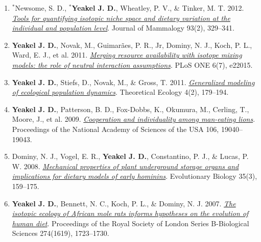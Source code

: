 \documentclass[margin,line,12pt]{res}
\begin{document}
\begin{resume}
\begin{enumerate}
\item ${}^\ast$Newsome, S. D., \textbf{${}^\ast$Yeakel J. D.}, Wheatley, P. V., \& Tinker, M. T. 2012. \href{https://academic.oup.com/jmammal/article/93/2/329/919625}{\emph{Tools for quantifying isotopic niche space and dietary variation at the individual and population level}}. Journal of Mammalogy 93(2), 329–341.

\item \textbf{Yeakel J. D.}, Novak, M., Guimar\~aes, P. R., Jr, Dominy, N. J., Koch, P. L., Ward, E. J., et al. 2011. \href{https://journals.plos.org/plosone/article?id=10.1371/journal.pone.0022015}{\emph{Merging resource availability with isotope mixing models: the role of neutral interaction assumptions}}. PLoS ONE 6(7), e22015.

\item \textbf{Yeakel J. D.}, Stiefs, D., Novak, M., \& Gross, T. 2011. \href{https://link.springer.com/article/10.1007/s12080-011-0112-6}{\emph{Generalized modeling of ecological population dynamics}}. Theoretical Ecology 4(2), 179–194.

\item \textbf{Yeakel J. D.}, Patterson, B. D., Fox-Dobbs, K., Okumura, M., Cerling, T., Moore, J., et al. 2009. \href{https://www.pnas.org/content/106/45/19040}{\emph{Cooperation and individuality among man-eating lions}}. Proceedings of the National Academy of Sciences of the USA 106, 19040–19043.

\item Dominy, N. J., Vogel, E. R., \textbf{Yeakel J. D.}, Constantino, P. J., \& Lucas, P. W. 2008. \href{https://link.springer.com/article/10.1007/s11692-008-9026-7}{\emph{Mechanical properties of plant underground storage organs and implications for dietary models of early hominins}}. Evolutionary Biology 35(3), 159–175.

\item \textbf{Yeakel J. D.}, Bennett, N. C., Koch, P. L., \& Dominy, N. J. 2007. \href{https://royalsocietypublishing.org/doi/10.1098/rspb.2007.0330}{\emph{The isotopic ecology of African mole rats informs hypotheses on the evolution of human diet}}. Proceedings of the Royal Society of London Series B-Biological Sciences 274(1619), 1723–1730.

\end{enumerate}

%
%



\end{resume}
\end{document}
